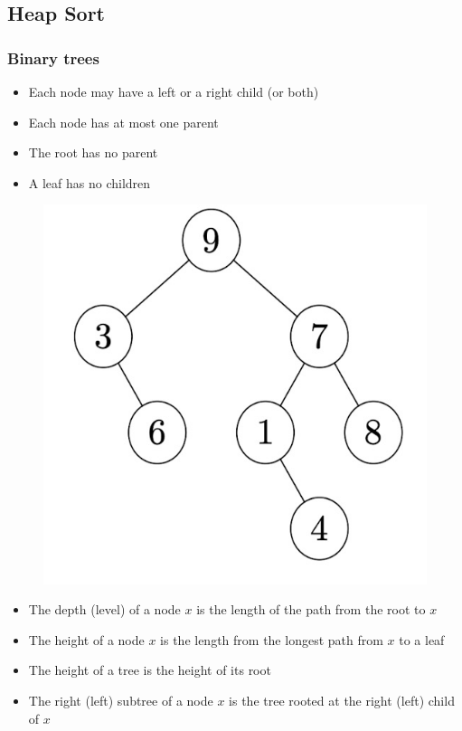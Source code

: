 \subsection{Heap Sort}

\subsubsection{Binary trees}

\begin{minipage}{0.6\textwidth}
    \begin{itemize}
        \item Each node may have a left or a right child (or both)
        \item Each node has at most one parent 
        \item The root has no parent
        \item A leaf has no children
        \end{itemize}
        \end{minipage}
        \begin{minipage}{0.4\textwidth}
            \begin{figure}[H]
                \includegraphics[width=.5\linewidth]{images/Screenshot 2024-05-30 at 14.59.56.jpg}
            \end{figure}
        \end{minipage}
\begin{itemize}
    \item The depth (level) of a node $x$ is the length of the path from the root to $x$
    \item The height of a node $x$ is the length from the longest path from $x$ to a leaf
    \item The height of a tree is the height of its root
    \item The right (left) subtree of a node $x$ is the tree rooted at the right (left) child of $x$
\end{itemize}

